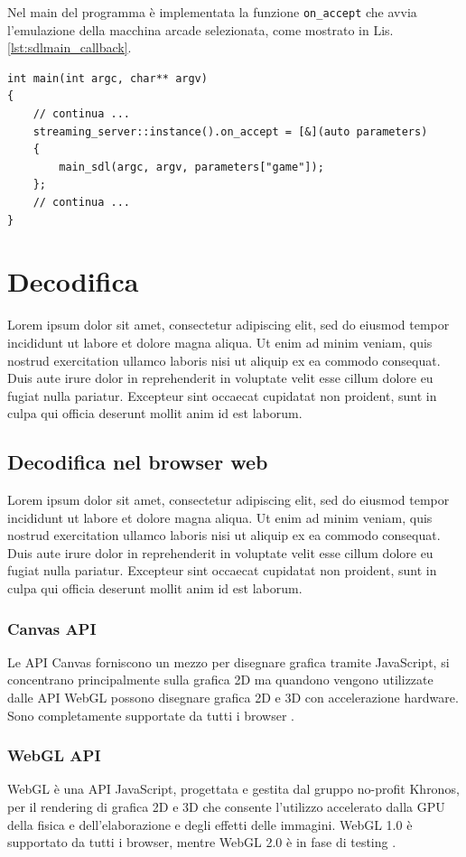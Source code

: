 Nel main del programma è implementata la funzione \verb|on_accept| che avvia l'emulazione della macchina arcade selezionata, come mostrato in Lis. \ref{lst:sdlmain_callback}.

\begin{lstlisting}[caption=Codice relativo alla callback di avvenuta connessione, label={lst:sdlmain_callback}]
int main(int argc, char** argv)
{
	// continua ...
	streaming_server::instance().on_accept = [&](auto parameters)
	{
		main_sdl(argc, argv, parameters["game"]);
	};
	// continua ...
}	
\end{lstlisting}




\section{Decodifica}
Lorem ipsum dolor sit amet, consectetur adipiscing elit, sed do eiusmod tempor incididunt ut labore et dolore magna aliqua. Ut enim ad minim veniam, quis nostrud exercitation ullamco laboris nisi ut aliquip ex ea commodo consequat. Duis aute irure dolor in reprehenderit in voluptate velit esse cillum dolore eu fugiat nulla pariatur. Excepteur sint occaecat cupidatat non proident, sunt in culpa qui officia deserunt mollit anim id est laborum.

\subsection{Decodifica nel browser web}
Lorem ipsum dolor sit amet, consectetur adipiscing elit, sed do eiusmod tempor incididunt ut labore et dolore magna aliqua. Ut enim ad minim veniam, quis nostrud exercitation ullamco laboris nisi ut aliquip ex ea commodo consequat. Duis aute irure dolor in reprehenderit in voluptate velit esse cillum dolore eu fugiat nulla pariatur. Excepteur sint occaecat cupidatat non proident, sunt in culpa qui officia deserunt mollit anim id est laborum.

\subsubsection{Canvas API}
Le API Canvas forniscono un mezzo per disegnare grafica tramite JavaScript, si concentrano principalmente sulla grafica 2D ma quandono vengono utilizzate dalle API WebGL possono disegnare grafica 2D e 3D con accelerazione hardware. Sono completamente supportate da tutti i browser \parencite{Canvas_API}.

\subsubsection{WebGL API}
WebGL è una API JavaScript, progettata e gestita dal gruppo no-profit Khronos, per il rendering di grafica 2D e 3D che consente l'utilizzo accelerato dalla GPU della fisica e dell'elaborazione e degli effetti delle immagini. WebGL 1.0 è supportato da tutti i browser, mentre WebGL 2.0 è in fase di testing \parencite{WebGL}.

